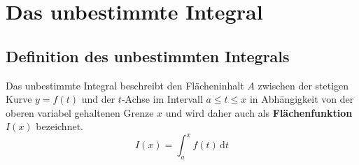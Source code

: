 \section{Das unbestimmte Integral}
\subsection{Definition des unbestimmten Integrals}
Das unbestimmte Integral beschreibt den Flächeninhalt $A$ zwischen der stetigen Kurve $y=f\left(t\right)$ und der $t$-Achse im Intervall $a\leq t\leq x$ in Abhängigkeit von der oberen variabel gehaltenen Grenze $x$ und wird daher auch als \textbf{Flächenfunktion} $I\left(x\right)$ bezeichnet.
\begin{equation}
\boxed{I\left(x\right)=\displaystyle \int_a^xf\left(t\right)\,\text{d}t}
\end{equation}
